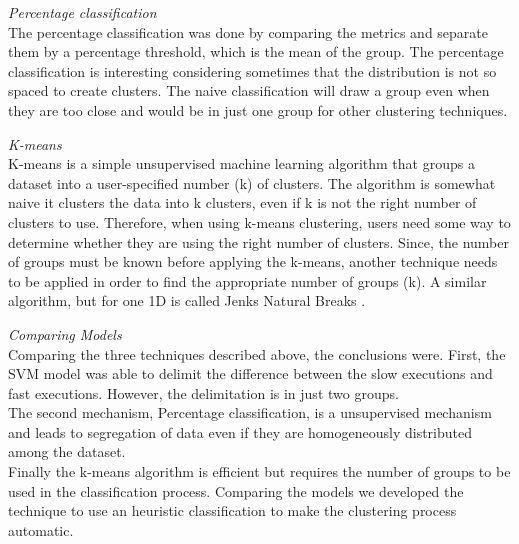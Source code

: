     
    

\textit{Percentage classification}\\
The percentage classification was done by comparing the metrics and separate them by a percentage threshold, which is the mean of the group. The percentage classification is interesting considering sometimes that the distribution is not so spaced to create clusters. The naive classification will draw a group even when they are too close and would be in just one group for other clustering techniques.
    
\textit{K-means}\\
K-means is a simple unsupervised machine learning algorithm that groups a dataset into a user-specified number (k) of clusters. The algorithm is somewhat naive it clusters the data into k clusters, even if k is not the right number of clusters to use. Therefore, when using k-means clustering, users need some way to determine whether they are using the right number of clusters.
Since, the number of groups must be known before applying the k-means, another technique needs to be applied in order to find the appropriate number of groups (k). A similar algorithm, but for one 1D is called Jenks Natural Breaks \cite{break}.
    
     
    
\textit{Comparing Models}\\
Comparing the three techniques described above, the conclusions were. First, the SVM model was able to delimit the difference between the slow executions and fast executions. However, the delimitation is in just two groups. \\
The second mechanism, Percentage classification, is a unsupervised mechanism and leads to segregation of data even if they are homogeneously distributed among the dataset. \\
Finally the k-means algorithm is efficient but requires the number of groups to be used in the classification process. Comparing the models we developed the technique to use an heuristic classification to make the clustering process automatic.
    
